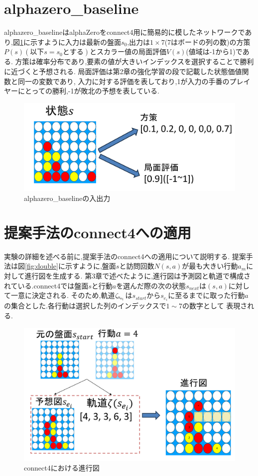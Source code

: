 \section{alphazero\_baseline}
alphazero\_baseline\cite{baseline}はalphaZeroをconnect4用に簡易的に模したネットワークであり,図\ref{fig:baseline}に示すように入力は最新の盤面$s_0$,出力は$1\times7$(7はボードの列の数)の方策$P(s)(以下s=s_0とする)$とスカラー値の局面評価$V(s)$(値域は-1から1)である.
方策は確率分布であり,要素の値が大きいインデックスを選択することで勝利に近づくと予想される.
局面評価は第2章の強化学習の段で記載した状態価値関数と同一の変数であり,
入力に対する評価を表しており,1が入力の手番のプレイヤーにとっての勝利,-1が敗北の予想を表している.

\begin{figure}[t]
    \centering
    \includegraphics[trim={0cm 0cm 0cm 0cm},clip]{./figure/baseline.png}

    \caption{alphazero\_baselineの入出力}
    \label{fig:baseline}
\end{figure}
\section{提案手法のconnect4への適用}
実験の詳細を述べる前に,提案手法のconnect4への適用について説明する.
提案手法は図\ref{fig:double}に示すように,盤面$s$と訪問回数$N(s, a)$が最も大きい行動$a_m$に対して進行図を生成する.
第3章で述べたように,進行図は予測図と軌道で構成されている.connect4では盤面$s$と行動$a$を選んだ際の次の状態$s_{next}$は$(s, a)$に対して一意に決定される.
そのため,軌道$\rm{{\zeta}_{s_{e_i}}}$は$s_{start}$から$s_{e_i}$に至るまでに取った行動$a$の集合とした.各行動は選択した列のインデックスで$1\sim7$の数字として
表現される.
\begin{figure}[t]
	\centering
	\includegraphics[width=\linewidth]{./figure/double.png}
	\caption{connect4における進行図}
	\label{fig:compare}
\end{figure}


